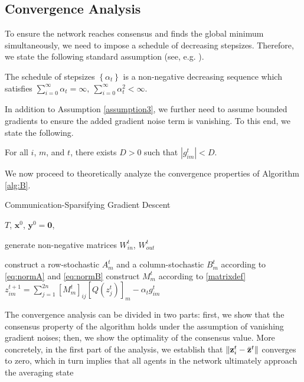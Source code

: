 \subsection{Convergence Analysis}
To ensure the network reaches consensus and finds the global minimum simultaneously, we need to impose a schedule of decreasing stepsizes. Therefore, we state the following standard assumption (see, e.g. \cite{nedic2009distributed,nedic2014distributed,xi2017distributed}).
\begin{assumption}\label{assumption3}
The schedule of stepsizes $\left\{\alpha_t\right\}$ is a non-negative decreasing
sequence which satisfies $\sum_{i=0}^{\infty}\alpha_t=\infty, \   \sum_{i=0}^{\infty}\alpha_t^2<\infty$.
\end{assumption}
In addition to Assumption \ref{assumption3}, we further need to assume bounded gradients to ensure the added gradient noise term is vanishing. To this end, we state the following.
\begin{assumption}\label{assumption4}
For all $i$, $m$, and $t$, there exists $D>0$ such that $|g_{im}^t|<D$.
\end{assumption}
We now proceed to theoretically analyze the convergence properties of Algorithm \ref{alg:B}.
\begin{algorithm}[t]
\caption{Communication-Sparsifying Gradient Descent}
\label{alg:B}
\begin{algorithmic}
   $T$, %
   $\mathbf{x}^0$, %
   $\mathbf{y}^0=\mathbf{0}$, %
   
\STATE generate non-negative matrices $W^t_{in}$, $W^t_{out}$

\STATE construct a row-stochastic $A^t_m$  and a column-stochastic $B^t_m$ according to \eqref{eq:normA} and \eqref{eq:normB} 
\STATE construct $M^t_m$ according to \eqref{matrixdef}
\STATE $z_{im}^{t+1}=\sum_{j=1}^{2n}[M^t_m]_{ij} [Q(z_{j}^t)]_m -\alpha_t g_{im}^t$
\ENDFOR
\ENDFOR
\ENDFOR
\end{algorithmic}
\end{algorithm}
The convergence analysis can be divided in two parts: first, we show that the consensus property of the algorithm holds under the assumption of vanishing gradient noises; then, we show the optimality of the consensus value. More concretely, in the first part of the analysis, we establish that $\|\mathbf{z}^t_i-\Bar{\mathbf{z}}^t\|$ converges to zero, which in turn implies that all agents in the network ultimately approach the averaging state 
